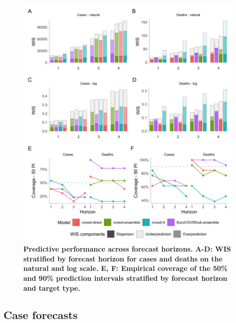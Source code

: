 \documentclass[10pt,a4paper,twocolumn]{article}
\begin{document}
\begin{figure}
\centering
\includegraphics[width=0.99\textwidth]{../output/figures/performance.png}
\caption{\bf{Predictive performance across forecast horizons.} A-D: WIS stratified by forecast horizon for cases and deaths on the natural and log scale. E, F: Empirical coverage of the 50\% and 90\% prediction intervals stratified by forecast horizon and target type.}
\label{fig:performance}
\end{figure}

\subsection*{Case forecasts}
\end{document}
